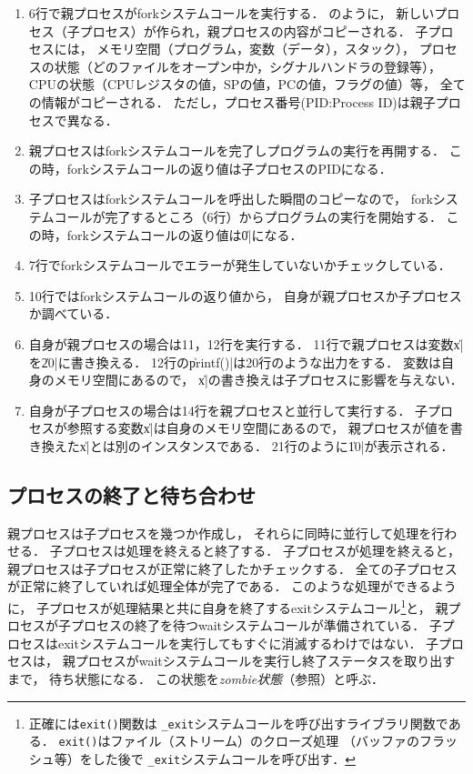 \begin{description}
  \begin{enumerate}
  \item 6行で親プロセスがforkシステムコールを実行する．
    のように，
    新しいプロセス（子プロセス）が作られ，親プロセスの内容がコピーされる．
    子プロセスには，
    メモリ空間（プログラム，変数（データ），スタック），
    プロセスの状態（どのファイルをオープン中か，シグナルハンドラの登録等），
    CPUの状態（CPUレジスタの値，SPの値，PCの値，フラグの値）等，
    全ての情報がコピーされる．
    ただし，プロセス番号(PID:Process ID)は親子プロセスで異なる．
  \item 親プロセスはforkシステムコールを完了しプログラムの実行を再開する．
    この時，forkシステムコールの返り値は子プロセスのPIDになる．
  \item 子プロセスはforkシステムコールを呼出した瞬間のコピーなので，
    forkシステムコールが完了するところ（6行）からプログラムの実行を開始する．
    この時，forkシステムコールの返り値は\|0|になる．
  \item 7行でforkシステムコールでエラーが発生していないかチェックしている．
  \item 10行ではforkシステムコールの返り値から，
    自身が親プロセスか子プロセスか調べている．
  \item 自身が親プロセスの場合は11，12行を実行する．
    11行で親プロセスは変数\|x|を\|20|に書き換える．
    12行の\|printf()|は20行のような出力をする．
    変数は自身のメモリ空間にあるので，
    \|x|の書き換えは子プロセスに影響を与えない．
  \item 自身が子プロセスの場合は14行を親プロセスと並行して実行する．
    子プロセスが参照する変数\|x|は自身のメモリ空間にあるので，
    親プロセスが値を書き換えた\|x|とは別のインスタンスである．
    21行のように\|10|が表示される．
  \end{enumerate}
\end{description}

\subsection{プロセスの終了と待ち合わせ}
親プロセスは子プロセスを幾つか作成し，
それらに同時に並行して処理を行わせる．
子プロセスは処理を終えると終了する．
子プロセスが処理を終えると，
親プロセスは子プロセスが正常に終了したかチェックする．
全ての子プロセスが正常に終了していれば処理全体が完了である．
このような処理ができるように，
子プロセスが処理結果と共に自身を終了するexitシステムコール\footnote{
  正確には\texttt{exit()}関数は
  \texttt{\_exit}システムコールを呼び出すライブラリ関数である．
  \texttt{exit()}はファイル（ストリーム）のクローズ処理
  （バッファのフラッシュ等）をした後で
  \texttt{\_exit}システムコールを呼び出す．
}と，
親プロセスが子プロセスの終了を待つwaitシステムコールが準備されている．
子プロセスはexitシステムコールを実行してもすぐに消滅するわけではない．
子プロセスは，
親プロセスがwaitシステムコールを実行し終了ステータスを取り出すまで，
待ち状態になる．
この状態を\emph{zombie状態}（参照）と呼ぶ．


